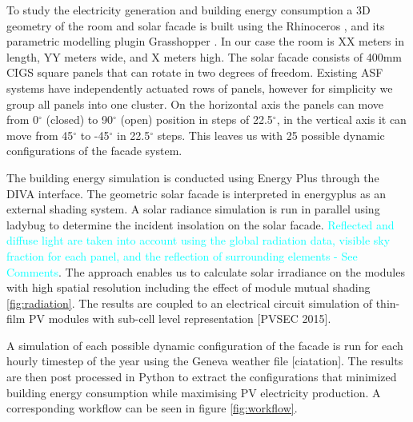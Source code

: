 
To study the electricity generation and building energy consumption a 3D geometry of the room and solar facade is built using the Rhinoceros \cite{Rhino}, and its parametric modelling plugin Grasshopper \cite{grasshopper}. In our case the room is XX meters in length, YY meters wide, and X meters high. The solar facade consists of 400mm CIGS square panels that can rotate in two degrees of freedom. Existing ASF systems have independently actuated rows of panels, however for simplicity we group all panels into one cluster. On the horizontal axis the panels can move from 0$^{\circ}$ (closed) to 90$^{\circ}$ (open) position in steps of 22.5$^{\circ}$, in the vertical axis it can move from 45$^{\circ}$ to -45$^{\circ}$ in 22.5$^{\circ}$ steps. This leaves us with 25 possible dynamic configurations of the facade system. 

The building energy simulation is conducted using Energy Plus \cite{energyplus} through the DIVA \cite{DIVA} interface. The geometric solar facade is interpreted in energyplus as an external shading system. A solar radiance simulation is run in parallel using ladybug \cite{roudsari2014ladybug} to determine the incident insolation on the solar facade. \textcolor{cyan}{Reflected and diffuse light are taken into account using the global radiation data, visible sky fraction for each panel, and the reflection of surrounding elements - See Comments}. The approach enables us to calculate solar irradiance on the modules with high spatial resolution including the effect of module mutual shading \ref{fig:radiation}. The results are coupled to an electrical circuit simulation of thin-film PV modules with sub-cell level representation [PVSEC 2015].

A simulation of each possible dynamic configuration of the facade is run for each hourly timestep of the year using the Geneva weather file [ciatation]. The results are then post processed in Python to extract the configurations that minimized building energy consumption while maximising PV electricity production. A corresponding workflow can be seen in figure \ref{fig:workflow}. 




